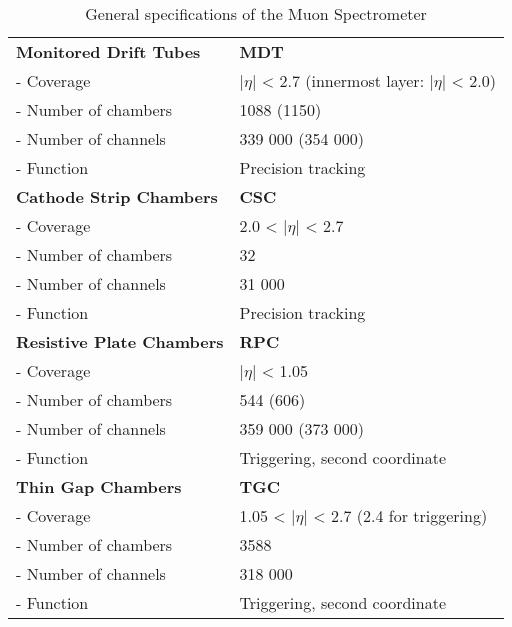 \begin{table}[] \centering
\caption{General specifications of the Muon Spectrometer \cite{atlas_tdr}}
\label{tab:muon_specs}
\begin{tabular}{|l|l|}
\hline
\textbf{Monitored Drift Tubes}    & \textbf{MDT}                                                      \\
- Coverage               & $|\eta|$ < 2.7 (innermost layer: $|\eta|$ < 2.0)         \\
- Number of chambers     & 1088 (1150)                                              \\
- Number of channels     & 339 000 (354 000)                                        \\
- Function               & Precision tracking                                       \\
\hline
\textbf{Cathode Strip Chambers}   & \textbf{CSC}                                                      \\
- Coverage               & 2.0 < $|\eta|$ < 2.7                                     \\
- Number of chambers     & 32                                                       \\
- Number of channels     & 31 000                                                   \\
- Function               & Precision tracking                                       \\
\hline
\textbf{Resistive Plate Chambers} & \textbf{RPC}                                                      \\
- Coverage               & $|\eta|$ < 1.05                                          \\
- Number of chambers     & 544 (606)                                                \\
- Number of channels     & 359 000 (373 000)                                        \\
- Function               & Triggering, second coordinate                            \\
\hline
\textbf{Thin Gap Chambers}        & \textbf{TGC}                                                      \\
- Coverage               & 1.05 < $|\eta|$ < 2.7 (2.4 for triggering)               \\
- Number of chambers     & 3588                                                     \\
- Number of channels     & 318 000                                                  \\
- Function               & Triggering, second coordinate                            \\
\hline
\end{tabular} \end{table}

